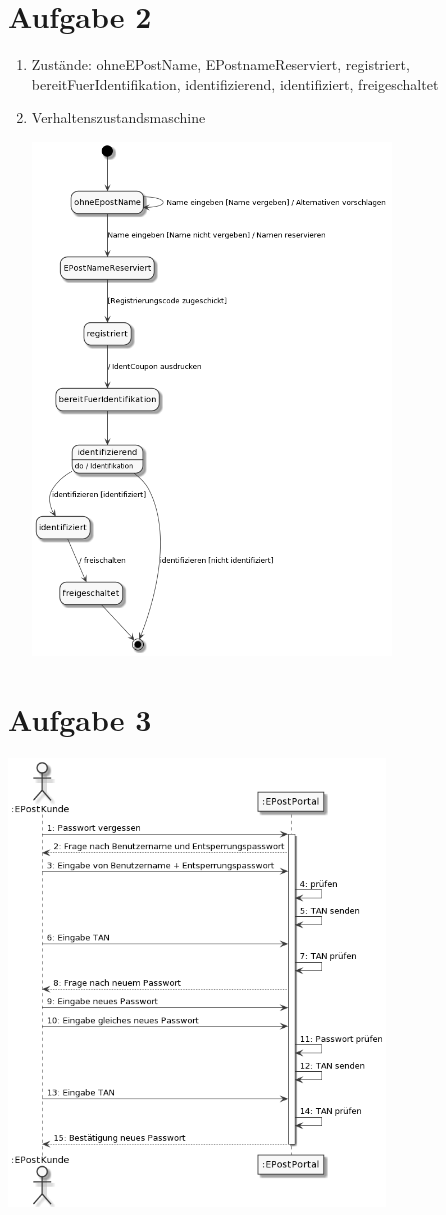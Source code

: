 \documentclass{article}
\begin{document}
	\section*{Aufgabe 2}
	\begin{enumerate}[label=(\alph*)]
		\item Zustände: ohneEPostName, EPostnameReserviert, registriert, bereitFuerIdentifikation, identifizierend, identifiziert, freigeschaltet
		\item Verhaltenszustandsmaschine
		\begin{center}
			\includegraphics[width=0.75\textwidth]{./Aufgabe12_2b}
		\end{center}
	\end{enumerate}

	\section*{Aufgabe 3}
	\begin{center}
		\includegraphics[width=0.75\textwidth]{./Aufgabe12_3}
	\end{center}
	
\end{document}
